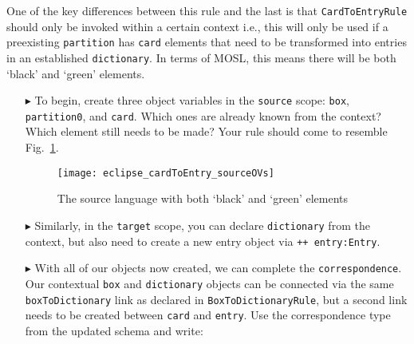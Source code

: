 One of the key differences between this rule and the last is that \texttt{CardToEntryRule} should only be invoked within a certain context i.e.,
this will only be used if a preexisting \texttt{partition} has \texttt{card} elements that need to be transformed into entries in an established
\texttt{dictionary}. In terms of MOSL, this means there will be both `black' and `green' elements.

\begin{itemize}

\item[$\blacktriangleright$] To begin, create three object variables in the \texttt{source} scope: \texttt{box}, \texttt{partition0}, and \texttt{card}. Which
ones are already known from the context? Which element still needs to be made? Your rule should come to resemble Fig.~\ref{eclipse:c2eRuleSource}.

\begin{figure}[htbp]
\begin{center}
  \texttt{[image: eclipse\_cardToEntry\_sourceOVs]}
  \caption{The source language with both `black' and `green' elements}
  \label{eclipse:c2eRuleSource}
\end{center}
\end{figure}

\item[$\blacktriangleright$] Similarly, in the \texttt{target} scope, you can declare \texttt{dictionary} from the context, but also need to create a new
entry object via \texttt{++ entry:Entry}. 

\vspace{0.5cm}

\item[$\blacktriangleright$] With all of our objects now created, we can complete the \texttt{correspondence}. Our contextual \texttt{box} and
\texttt{dictionary} objects can be connected via the same \texttt{boxToDictionary} link as declared in \texttt{BoxToDictionaryRule}, but a second link needs to
be created between \texttt{card} and \texttt{entry}. Use the correspondence type from the updated schema and write: 



\end{itemize}
